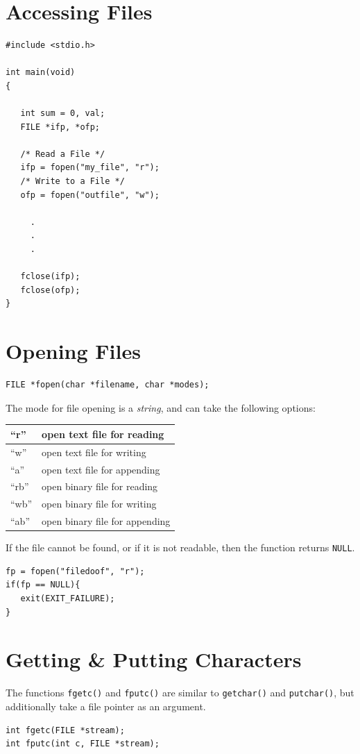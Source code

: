 \documentclass[a4,portraitt]{slides}
\begin{document}
\newpage
\section*{Accessing Files}
\vspace{-0.75em}
\begin{verbatim}
#include <stdio.h>

int main(void)
{

   int sum = 0, val;
   FILE *ifp, *ofp;

   /* Read a File */
   ifp = fopen("my_file", "r");
   /* Write to a File */
   ofp = fopen("outfile", "w");

     .
     .
     .

   fclose(ifp);
   fclose(ofp);
}
\end{verbatim}
\vspace{-0.75em}
\newpage
\section*{Opening Files}
\vspace{-0.75em}
{\small
\begin{verbatim}
FILE *fopen(char *filename, char *modes);
\end{verbatim}
}
\vspace{-0.75em}
The mode for file opening is a {\it string}, and can
take the following options:
\begin{center}
\begin{tabular}{|l|l|}\hline
``r''  & open text file for reading \\ \hline
``w''  & open text file for writing \\ \hline
``a''  & open text file for appending\\ \hline
``rb'' & open binary file for reading \\ \hline
``wb''  & open binary file for writing\\ \hline
``ab''  & open binary file for appending\\ \hline
\end{tabular}
\end{center}
If the file cannot be found, or if it is not readable,
then the function returns \verb^NULL^.
\vspace{-0.75em}
\begin{verbatim}
fp = fopen("filedoof", "r");
if(fp == NULL){
   exit(EXIT_FAILURE);
}
\end{verbatim}

\newpage
\section*{Getting \& Putting Characters}
The functions \verb^fgetc()^ and \verb^fputc()^ are
similar to \verb^getchar()^ and \verb^putchar()^, but
additionally take a file pointer as an argument.
\vspace{-0.75em}
\begin{verbatim}
int fgetc(FILE *stream);
int fputc(int c, FILE *stream);
\end{verbatim}
\end{document}
